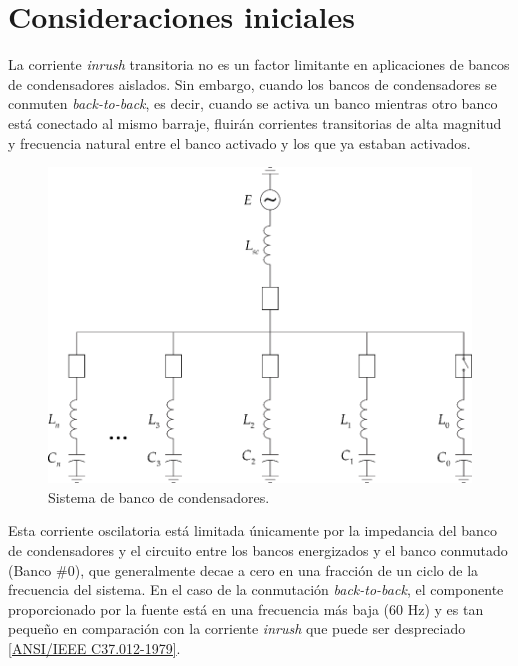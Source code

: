 \documentclass[a4paper]{article}
\begin{document}
	\section{Consideraciones iniciales}
	
	La corriente \textit{inrush} transitoria no es un factor limitante en aplicaciones de bancos de condensadores aislados. Sin embargo, cuando los bancos de condensadores se conmuten \textit{back-to-back}, es decir, cuando se activa un banco mientras otro banco está conectado al mismo barraje, fluirán corrientes transitorias de alta magnitud y frecuencia natural entre el banco activado y los que ya estaban activados.
	
	\begin{figure}[!hbp]
		\centering
		\includegraphics{Picture1.png}
		\caption{Sistema de banco de condensadores.}
		\label{fig:picture1}
	\end{figure}
	
	Esta corriente oscilatoria está limitada únicamente por la impedancia del banco de condensadores y el circuito entre los bancos energizados y el banco conmutado (Banco \#0), que generalmente decae a cero en una fracción de un ciclo de la frecuencia del sistema. En el caso de la conmutación \textit{back-to-back}, el componente proporcionado por la fuente está en una frecuencia más baja (60 Hz) y es tan pequeño en comparación con la corriente \textit{inrush} que puede ser despreciado \href{https://ieeexplore.ieee.org/document/7035261}{[ANSI/IEEE C37.012-1979]}.
	
\end{document}
